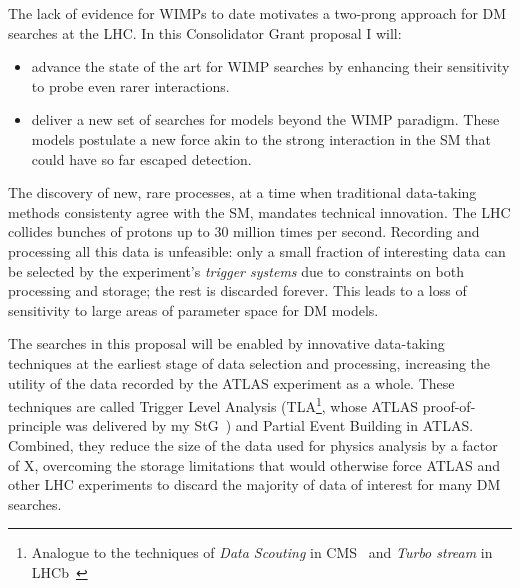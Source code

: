 \documentclass[11pt,a4paper]{article}
\begin{document}
The lack of evidence for WIMPs to date motivates a two-prong approach for DM searches at the LHC. In this Consolidator Grant proposal I will:
\begin{itemize}
    \item advance the state of the art for WIMP searches by enhancing their sensitivity to probe even rarer interactions.%
    \item deliver a new set of searches for models beyond the WIMP paradigm. These models postulate a new force akin to the strong interaction in the SM that could have so far escaped detection. 
\end{itemize}

The discovery of new, rare processes, at a time when traditional data-taking methods consistenty agree with the SM, mandates technical innovation. The LHC collides bunches of protons up to 30 million times per second. Recording and processing all this data is unfeasible: only a small fraction of interesting data can be selected by the experiment’s \textit{trigger systems} due to constraints on both processing and storage; the rest is discarded forever. This leads to a loss of sensitivity to large areas of parameter space for DM models. 

The searches in this proposal will be enabled by innovative data-taking techniques at the earliest stage of data selection and processing, increasing the utility of the data recorded by the ATLAS experiment as a whole. 
These techniques are called Trigger Level Analysis (TLA\footnote{Analogue to the techniques of \textit{Data Scouting} in CMS~\cite{Khachatryan:2016ecr} and \textit{Turbo stream} in LHCb~\cite{Aaij:2016rxn}}, whose ATLAS proof-of-principle was delivered by my StG~\cite{Aaboud:2018fzt}) and Partial Event Building in ATLAS. 
Combined, they reduce the size of the data used for physics analysis by a factor of \color{red}X\color{black}, overcoming the storage limitations that would otherwise force ATLAS and other LHC experiments to discard the majority of data of interest for many DM searches. %
\end{document}
